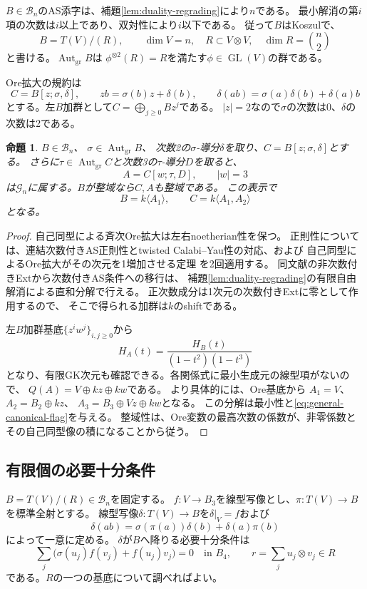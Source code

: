 \documentclass[11pt,a4paper]{ltjsarticle}
\newtheorem{proposition}[theorem]{命題}
\theoremstyle{definition}
\newcommand{\Aut}{\operatorname{Aut}}
\newcommand{\GL}{\operatorname{GL}}
\newcommand{\Gclass}{\mathcal G}
\newcommand{\Bclass}{\mathcal B}
\begin{document}
$B\in\Bclass_n$のAS添字は、補題\ref{lem:duality-regrading}により$n$である。
最小解消の第$i$項の次数は$i$以上であり、双対性により$i$以下である。
従って$B$はKoszulで、
\[
B=T(V)/(R),\qquad \dim V=n,\quad
R\subset V\otimes V,\quad \dim R=\binom n2
\]
と書ける。$\Aut_{\mathrm{gr}}B$は
$\phi^{\otimes2}(R)=R$を満たす$\phi\in\GL(V)$の群である。

Ore拡大の規約は
\[
C=B[z;\sigma,\delta],\qquad
zb=\sigma(b)z+\delta(b),\qquad
\delta(ab)=\sigma(a)\delta(b)+\delta(a)b
\]
とする。左$B$加群として$C=\bigoplus_{j\geq0}Bz^j$である。
$|z|=2$なので$\sigma$の次数は0、$\delta$の次数は2である。

\begin{proposition}\label{prop:ore-construction}
$B\in\Bclass_n$、
$\sigma\in\Aut_{\mathrm{gr}}B$、
次数2の$\sigma$-導分$\delta$を取り、$C=B[z;\sigma,\delta]$とする。
さらに$\tau\in\Aut_{\mathrm{gr}}C$と次数3の$\tau$-導分$D$を取ると、
\[
A=C[w;\tau,D],\qquad |w|=3
\]
は$\Gclass_n$に属する。$B$が整域なら$C,A$も整域である。
この表示で
\begin{equation}\label{eq:general-canonical-flag}
B=k\langle A_1\rangle,\qquad C=k\langle A_1,A_2\rangle
\end{equation}
となる。
\end{proposition}

\begin{proof}
自己同型による斉次Ore拡大は左右noetherian性を保つ。
正則性については、連結次数付きAS正則性とtwisted Calabi--Yau性の対応、および
自己同型によるOre拡大がその次元を1増加させる定理
\cite[\S1.2, Lemma 1.3, Theorem 3.3]{LWW}を2回適用する。
同文献の非次数付きExtから次数付きAS条件への移行は、
補題\ref{lem:duality-regrading}の有限自由解消による直和分解で行える。
正次数成分は1次元の次数付きExtに零として作用するので、
そこで得られる加群は$k$のshiftである。

左$B$加群基底$\{z^iw^j\}_{i,j\geq0}$から
\[
H_A(t)=\frac{H_B(t)}{(1-t^2)(1-t^3)}
\]
となり、有限GK次元も確認できる。各関係式に最小生成元の線型項がないので、
$Q(A)=V\oplus kz\oplus kw$である。
より具体的には、Ore基底から
$A_1=V$、$A_2=B_2\oplus kz$、
$A_3=B_3\oplus Vz\oplus kw$となる。
この分解は最小性と\eqref{eq:general-canonical-flag}を与える。
整域性は、Ore変数の最高次数の係数が、非零係数とその自己同型像の積になることから従う。
\end{proof}

\subsection{有限個の必要十分条件}
$B=T(V)/(R)\in\Bclass_n$を固定する。
$f:V\to B_3$を線型写像とし、$\pi:T(V)\to B$を標準全射とする。
線型写像$\delta:T(V)\to B$を$\delta|_V=f$および
\[
\delta(ab)=\sigma(\pi(a))\delta(b)+\delta(a)\pi(b)
\]
によって一意に定める。
$\delta$が$B$へ降りる必要十分条件は
\begin{equation}\label{eq:general-delta}
\sum_j\bigl(\sigma(u_j)f(v_j)+f(u_j)v_j\bigr)=0
\quad\text{in }B_4,\qquad
r=\sum_j u_j\otimes v_j\in R
\end{equation}
である。$R$の一つの基底について調べればよい。
\end{document}
